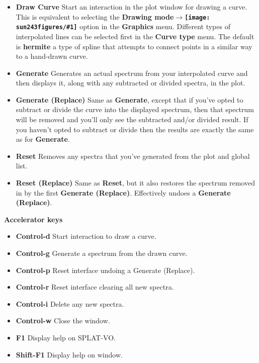 \documentclass[twoside,11pt]{article}
\newcommand{\htmladdimg}[1]{}
\newcommand{\latexhtml}[2]{#1}
\renewcommand{\_}{\texttt{\symbol{95}}}
\newcommand{\SPLAT}{\textsf{SPLAT-VO}}
\newcommand{\inline}[1]
        {\latexhtml{\texttt{[image: sun243\_figures/\#1]}}
        {\htmladdimg[align=center]{#1.gif}}}
\newcommand{\submenuitem}[2]{\latexhtml{\textbf{#1$\rightarrow$#2}}{\textbf{#1->#2}}}
\newcommand{\labelitem}[1]{\textbf{#1}}
\newcommand{\subheading}[1]{\textbf{\large{#1}}}
\begin{document}
\begin{itemize}

\item \labelitem{Draw Curve} Start an interaction in the plot window for
drawing a curve. This is equivalent to selecting the
\submenuitem{Drawing mode}{\inline{curve}} option in the
\labelitem{Graphics} menu.
Different types of interpolated lines can be selected first in the
\labelitem{Curve type} menu. The default is
\labelitem{hermite} a type of spline that attempts to connect points in a
similar way to a hand-drawn curve.

\item \labelitem{Generate} Generates an actual spectrum from your interpolated
curve and then displays it, along with any subtracted or divided spectra, in
the plot.

\item \labelitem{Generate (Replace)} Same as \labelitem{Generate}, except that
if you've opted to subtract or divide the curve into the displayed spectrum,
then that spectrum will be removed and you'll only see the subtracted and/or
divided result. If you haven't opted to subtract or divide then the results are
exactly the same as for \labelitem{Generate}.

\item \labelitem{Reset} Removes any spectra that you've generated from the
plot and global list.

\item \labelitem{Reset (Replace)} Same as \labelitem{Reset}, but it also
restores the spectrum removed in by the first \labelitem{Generate (Replace)}.
Effectively undoes a \labelitem{Generate (Replace)}.

\end{itemize}

\subheading{Accelerator keys}

\begin{itemize}
\item \labelitem{Control-d} Start interaction to draw a curve.
\item \labelitem{Control-g} Generate a spectrum from the drawn curve.
\item \labelitem{Control-p} Reset interface undoing a Generate (Replace).
\item \labelitem{Control-r} Reset interface clearing all new spectra.
\item \labelitem{Control-i} Delete any new spectra.

\item \labelitem{Control-w} Close the window.
\item \labelitem{F1} Display help on \SPLAT.
\item \labelitem{Shift-F1} Display help on window.
\end{itemize}
\end{document}
